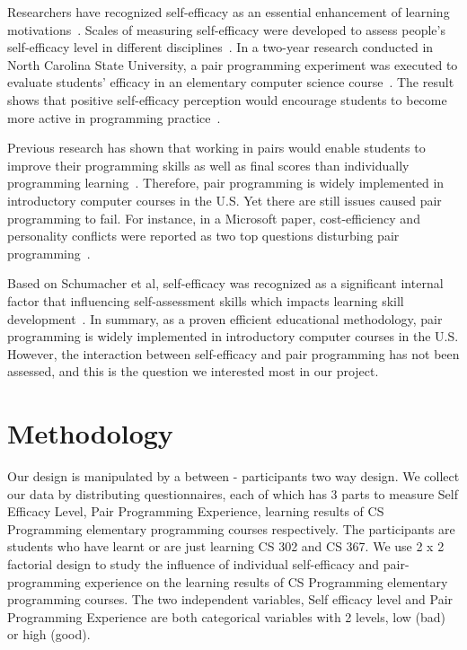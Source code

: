 \documentclass{sigchi}
\begin{document}
Researchers have recognized self-efficacy as an essential enhancement of learning motivations~\cite{zimmerman2000self}. Scales of measuring self-efficacy were developed to assess people's self-efficacy level in different disciplines~\cite{sherer1982self}. In a two-year research conducted in North Carolina State University, a pair programming experiment was executed to evaluate students' efficacy in an elementary computer science course~\cite{williams2001support}. The result shows that positive self-efficacy perception would encourage students to become more active in programming practice~\cite{kinnunen2011cs}. 

Previous research has shown that working in pairs would enable students to improve their programming skills as well as final scores than individually programming learning~\cite{williams2000all,mcdowell2002effects,mcdowell2003impact}. Therefore, pair programming is widely implemented in introductory computer courses in the U.S. Yet there are still issues caused pair programming to fail. For instance, in a Microsoft paper, cost-efficiency and personality conflicts were reported as two top questions disturbing pair programming~\cite{begel2008pair}.

Based on Schumacher et al, self-efficacy was recognized as a significant internal factor that influencing self-assessment skills which impacts learning skill development~\cite{schumacher2013developing}. In summary, as a proven efficient educational methodology, pair programming is widely implemented in introductory computer courses in the U.S. However, the interaction between self-efficacy and pair programming has not been assessed, and this is the question we interested most in our project.


\section{Methodology}
Our design is manipulated by a between - participants two way design. We collect our data by distributing questionnaires, each of which has 3 parts to measure Self Efficacy Level, Pair Programming Experience, learning results of CS Programming elementary programming courses respectively. The participants are students who have learnt or are just learning CS 302 and CS 367. We use 2 x 2 factorial design to study the influence of individual self-efficacy and pair-programming experience on the learning results of CS Programming elementary programming courses. The two independent variables, Self efficacy level and Pair Programming Experience are both categorical variables with 2 levels, low (bad) or high (good). 
\end{document}
